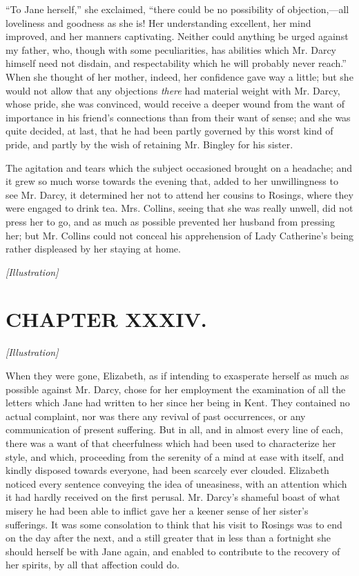 \documentclass[12pt]{book}
\begin{document}
``To Jane herself,'' she exclaimed, ``there could be no possibility of objection,---all loveliness and goodness as she is! Her understanding excellent, her mind improved, and her manners captivating. Neither could anything be urged against my father, who, though with some peculiarities, has abilities which Mr. Darcy himself need not disdain, and respectability which he will probably never reach.'' When she thought of her mother, indeed, her confidence gave way a little; but she would not allow that any objections \textit{there} had material weight with Mr. Darcy, whose pride, she was convinced, would receive a deeper wound from the want of importance in his friend's connections than from their want of sense; and she was quite decided, at last, that he had been partly governed by this worst kind of pride, and partly by the wish of retaining Mr. Bingley for his sister.

The agitation and tears which the subject occasioned brought on a headache; and it grew so much worse towards the evening that, added to her unwillingness to see Mr. Darcy, it determined her not to attend her cousins to Rosings, where they were engaged to drink tea. Mrs. Collins, seeing that she was really unwell, did not press her to go, and as much as possible prevented her husband from pressing her; but Mr. Collins could not conceal his apprehension of Lady Catherine's being rather displeased by her staying at home.

\emph{[Illustration]}

\chapter{CHAPTER XXXIV.}

\emph{[Illustration]}

When they were gone, Elizabeth, as if intending to exasperate herself as much as possible against Mr. Darcy, chose for her employment the examination of all the letters which Jane had written to her since her being in Kent. They contained no actual complaint, nor was there any revival of past occurrences, or any communication of present suffering. But in all, and in almost every line of each, there was a want of that cheerfulness which had been used to characterize her style, and which, proceeding from the serenity of a mind at ease with itself, and kindly disposed towards everyone, had been scarcely ever clouded. Elizabeth noticed every sentence conveying the idea of uneasiness, with an attention which it had hardly received on the first perusal. Mr. Darcy's shameful boast of what misery he had been able to inflict gave her a keener sense of her sister's sufferings. It was some consolation to think that his visit to Rosings was to end on the day after the next, and a still greater that in less than a fortnight she should herself be with Jane again, and enabled to contribute to the recovery of her spirits, by all that affection could do.
\end{document}
